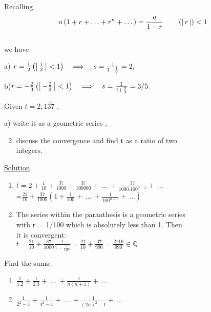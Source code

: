 \documentclass[11pt]{amsbook}
\begin{document}
\begin{hSolution} Recalling
$$a \left(1+r+\dotsc+r^n+\dotsc \right) =\frac{a}{1-r} \qquad \left( \left \lvert \, r \, \right \rvert \right) < 1 $$ \\
we have

a) $ r= \frac{1}{2} \left ( \left \lvert \, \frac{1}{2} \, \right \rvert < 1 \right )\quad \Longrightarrow \quad  s= \frac{1}{1-\frac{1}{2}} = 2 , $	

b)$ r= - \frac{2}{3} \left ( \left \lvert \, -\frac{2}{3} \, \right \rvert < 1 \right )\quad \Longrightarrow \quad  s= \frac{1}{1+\frac{2}{3}} = 3/5 . $
\end{hSolution}
\begin{exmp}
Given $ t = 2,1\overline{37}  $ ,

a) write it as a geometric series ,
 

\begin{enumerate}[label=(\alph*)]
	\setcounter{enumi}{1}

	\item discuss the convergence and find t as a ratio of two\\
	integers.

\end{enumerate}

\underline{Solution}.

\begin{enumerate}[label=(\alph*)]

	\item $t = 2+\frac{1}{10}+\frac{37}{1000}+\frac{37}{100000}+\ ...\ +\frac{37}{1000.100^{n-1}}+\ ...$\\
	=$\frac{21}{10}+\frac{37}{1000}(1+\frac{1}{100}+\ ...\ +\frac{1}{100^{n-1}}+\ ...)$

	\item The series within the paranthesis is a geometric series\\
	with r = 1/100 which is absolutely less than 1. Then\\
	it is convergent:\\
	$t=\frac{21}{10}+\frac{37}{1000}\frac{1}{1-\frac{1}{100}}=\frac{21}{10}+\frac{37}{990}=\frac{2116}{990} \in \mathbb{Q}$

\end{enumerate}
\end{exmp}
\begin{exmp} Find the sums:\\
\begin{enumerate}[label=(\alph*)]

	\item $\frac{1}{1.2}+\frac{1}{2.3}+\ ...\ +\frac{1}{n(n+1)}+\ ...$
	
	\item $\frac{1}{2^{2}-1}+\frac{1}{4^{2}-1}+\ ...\ +\frac{1}{(2n)^{2}-1}+\ ...$

\end{enumerate}
\end{exmp}
\end{document}
